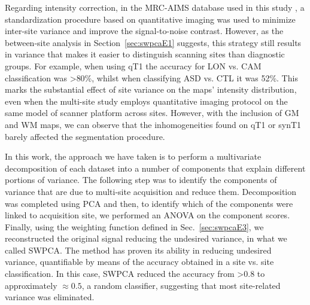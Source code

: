 Regarding intensity correction, in the \ac{MRC-AIMS} database used in this study \cite{Ecker2012,Ecker2013}, a standardization procedure based on quantitative imaging \cite{deoni2008standardized} was used to minimize inter-site variance and improve the signal-to-noise contrast. However, as the between-site analysis in Section~\ref{sec:swpcaE1} suggests, this strategy still results in variance that makes it easier to distinguish scanning sites than diagnostic groups. For example, when using \ac{qT1} the accuracy for LON vs. CAM classification was {\textgreater}80\%, whilst when classifying \ac{ASD} vs. \ac{CTL} it was 52\%. This marks the substantial effect of site variance on the maps' intensity distribution, even when the multi-site study employs quantitative imaging protocol on the same model of scanner platform across sites. However, with the inclusion of \ac{GM} and \ac{WM} maps, we can observe that the inhomogeneities found on \ac{qT1} or \ac{synT1} barely affected the segmentation procedure. 

In this work, the approach we have taken is to perform a multivariate decomposition of each dataset into a number of components that explain different portions of variance. The following step was to identify the components of variance that are due to multi-site acquisition and reduce them. Decomposition was completed using \ac{PCA} and then, to identify which of the components were linked to acquisition site, we performed an \ac{ANOVA} on the component scores. Finally, using the weighting function defined in Sec.~\ref{sec:swpcaE3}, we reconstructed the original signal reducing the undesired variance, in what we called \ac{SWPCA}. The method has proven its ability in reducing undesired variance, quantifiable by means of the accuracy obtained in a site vs. site classification. In this case, \ac{SWPCA} reduced the accuracy from {\textgreater}0.8 to approximately $\approx0.5$, a random classifier, suggesting that most site-related variance was eliminated. 

